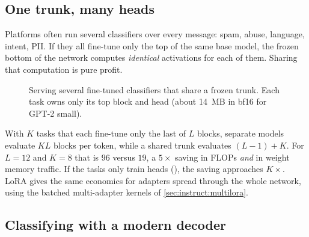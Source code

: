 \subsection{One trunk, many heads}

Platforms often run several classifiers over every message: spam, abuse, language,
intent, PII. If they all fine-tune only the top of the same base model, the frozen
bottom of the network computes \emph{identical} activations for each of them. Sharing
that computation is pure profit.

\begin{figure}[ht]
\centering
{}
\caption{Serving several fine-tuned classifiers that share a frozen trunk. Each task
owns only its top block and head (about \SI{14}{MB} in bf16 for GPT-2 small).}
\label{fig:classify:multihead}
\end{figure}

With $K$ tasks that each fine-tune only the last of $L$ blocks, separate models evaluate
$KL$ blocks per token, while a shared trunk evaluates $(L-1)+K$. For $L=12$ and $K=8$
that is $96$ versus $19$, a $5\times$ saving in FLOPs \emph{and} in weight memory traffic.
If the tasks only train heads (), the saving approaches
$K\times$. LoRA gives the same economics for adapters spread through the whole network,
using the batched multi-adapter kernels of \cref{sec:instruct:multilora}.

\subsection{Classifying with a modern decoder}

